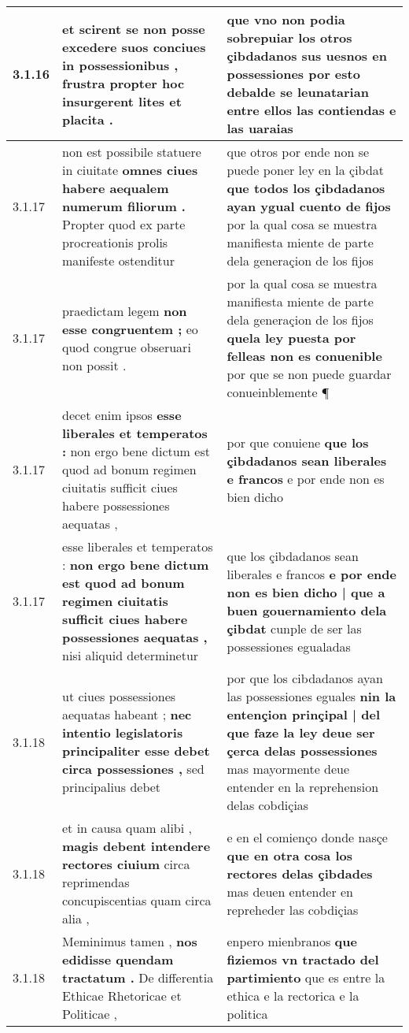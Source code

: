 \begin{tabular}{|p{1cm}|p{6.5cm}|p{6.5cm}|}
3.1.16 & et scirent se non posse \textbf{ excedere suos conciues in possessionibus , } frustra propter hoc insurgerent lites et placita . & que vno non podia sobrepuiar \textbf{ los otros çibdadanos sus uesnos en possessiones } por esto debalde se leunatarian entre ellos las contiendas e las uaraias \\\hline
3.1.17 & non est possibile statuere in ciuitate \textbf{ omnes ciues habere aequalem numerum filiorum . } Propter quod ex parte procreationis prolis manifeste ostenditur & que otros por ende non se puede poner ley en la çibdat \textbf{ que todos los çibdadanos ayan ygual cuento de fijos } por la qual cosa se muestra manifiesta miente de parte dela generaçion de los fijos \\\hline
3.1.17 & praedictam legem \textbf{ non esse congruentem ; } eo quod congrue obseruari non possit . & por la qual cosa se muestra manifiesta miente de parte dela generaçion de los fijos \textbf{ quela ley puesta por felleas non es conuenible } por que se non puede guardar conueinblemente ¶ \\\hline
3.1.17 & decet enim ipsos \textbf{ esse liberales et temperatos : } non ergo bene dictum est quod ad bonum regimen ciuitatis sufficit ciues habere possessiones aequatas , & por que conuiene \textbf{ que los çibdadanos sean liberales e francos } e por ende non es bien dicho \\\hline
3.1.17 & esse liberales et temperatos : \textbf{ non ergo bene dictum est quod ad bonum regimen ciuitatis sufficit ciues habere possessiones aequatas , } nisi aliquid determinetur & que los çibdadanos sean liberales e francos \textbf{ e por ende non es bien dicho | que a buen gouernamiento dela çibdat } cunple de ser las possessiones egualadas \\\hline
3.1.18 & ut ciues possessiones aequatas habeant ; \textbf{ nec intentio legislatoris principaliter esse debet circa possessiones , } sed principalius debet & por que los cibdadanos ayan las possessiones eguales \textbf{ nin la entençion prinçipal | del que faze la ley deue ser çerca delas possessiones } mas mayormente deue entender en la reprehension delas cobdiçias \\\hline
3.1.18 & et in causa quam alibi , \textbf{ magis debent intendere rectores ciuium } circa reprimendas concupiscentias quam circa alia , & e en el comienço donde nasçe \textbf{ que en otra cosa los rectores delas çibdades } mas deuen entender en repreheder las cobdiçias \\\hline
3.1.18 & Meminimus tamen , \textbf{ nos edidisse quendam tractatum . } De differentia Ethicae Rhetoricae et Politicae , & enpero mienbranos \textbf{ que fiziemos vn tractado del partimiento } que es entre la ethica e la rectorica e la politica \\\hline

\end{tabular}
